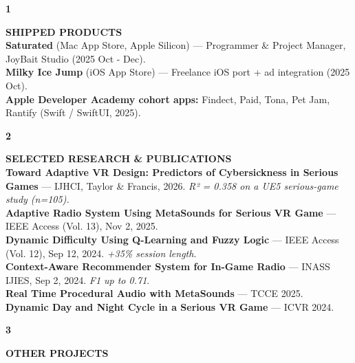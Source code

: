 \documentclass[11pt,a4paper]{article}
\begin{document}
\hspace{1cm}
\begin{minipage}[t]{18cm}

\begin{minipage}[t]{0.8cm}
{\Large\bfseries 1}
\end{minipage}%
\begin{minipage}[t]{17cm}
{\large\bfseries SHIPPED PRODUCTS}\\[8pt]

\textbf{Saturated} (Mac App Store, Apple Silicon) — Programmer \& Project Manager, JoyBait Studio (2025 Oct - Dec).\\
\textbf{Milky Ice Jump} (iOS App Store) — Freelance iOS port + ad integration (2025 Oct).\\
\textbf{Apple Developer Academy cohort apps:} Findect, Paid, Tona, Pet Jam, Rantify (Swift / SwiftUI, 2025).

\end{minipage}

\vspace{0.5cm}

\begin{minipage}[t]{0.8cm}
{\Large\bfseries 2}
\end{minipage}%
\begin{minipage}[t]{17cm}
{\large\bfseries SELECTED RESEARCH \& PUBLICATIONS}\\[8pt]

\textbf{Toward Adaptive VR Design: Predictors of Cybersickness in Serious Games} — IJHCI, Taylor \& Francis, 2026. \emph{R² = 0.358 on a UE5 serious-game study (n=105).}\\
\textbf{Adaptive Radio System Using MetaSounds for Serious VR Game} — IEEE Access (Vol. 13), Nov 2, 2025.\\
\textbf{Dynamic Difficulty Using Q-Learning and Fuzzy Logic} — IEEE Access (Vol. 12), Sep 12, 2024. \emph{+35\% session length}.\\
\textbf{Context-Aware Recommender System for In-Game Radio} — INASS IJIES, Sep 2, 2024. \emph{F1 up to 0.71}.\\
\textbf{Real Time Procedural Audio with MetaSounds} — TCCE 2025.\\
\textbf{Dynamic Day and Night Cycle in a Serious VR Game} — ICVR 2024.

\end{minipage}

\vspace{0.5cm}

\begin{minipage}[t]{0.8cm}
{\Large\bfseries 3}
\end{minipage}%
\begin{minipage}[t]{17cm}
{\large\bfseries OTHER PROJECTS}\\[8pt]


\end{minipage}
\end{minipage}
\end{document}
